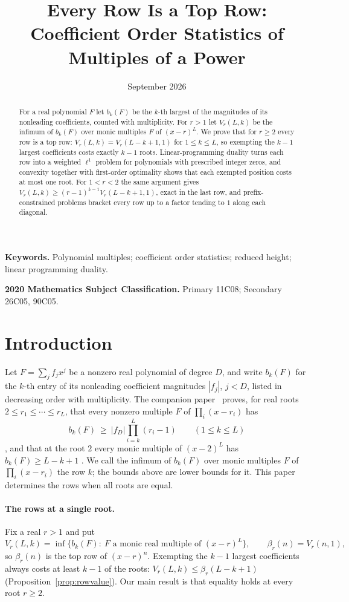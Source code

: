 \documentclass[11pt]{article}
\title{Every Row Is a Top Row: Coefficient Order Statistics of Multiples of a Power}
\author{\shortstack{Bangyen Pham\\
\small Independent Researcher\\
\small\href{mailto:bangyenp@gmail.com}{\texttt{bangyenp@gmail.com}}\\
\small\href{https://orcid.org/0009-0006-9928-2088}{ORCID: 0009-0006-9928-2088}}}
\date{September 2026}
\begin{document}
\maketitle

\begin{abstract}
For a real polynomial $F$ let $b_k(F)$ be the $k$-th largest of the
magnitudes of its nonleading coefficients, counted with multiplicity.
For $r>1$ let $V_r(L,k)$ be the infimum of $b_k(F)$ over monic multiples
$F$ of $(x-r)^L$.  We prove that for $r\ge2$ every row is a top row:
$V_r(L,k)=V_r(L-k+1,1)$ for $1\le k\le L$, so exempting the $k-1$ largest
coefficients costs exactly $k-1$ roots.  Linear-programming duality turns
each row into a weighted $\ell^1$ problem for polynomials with prescribed
integer zeros, and convexity together with first-order optimality shows
that each exempted position costs at most one root.  For $1<r<2$ the same
argument gives $V_r(L,k)\ge(r-1)^{k-1}V_r(L-k+1,1)$, exact in the last row,
and prefix-constrained problems bracket every row up to a factor tending
to $1$ along each diagonal.
\end{abstract}

\noindent\textbf{Keywords.} Polynomial multiples; coefficient order
statistics; reduced height; linear programming duality.

\noindent\textbf{2020 Mathematics Subject Classification.} Primary 11C08; Secondary 26C05, 90C05.

\section{Introduction}\label{sec:intro}

Let $F=\sum_jf_jx^j$ be a nonzero real polynomial of degree $D$, and write
$b_k(F)$ for the $k$-th entry of its nonleading coefficient magnitudes
$|f_j|$, $j<D$, listed in decreasing order with multiplicity.  The companion
paper~\cite{coefficient-mass} proves, for real
roots $2\le r_1\le\cdots\le r_L$, that every nonzero multiple $F$ of
$\prod_i(x-r_i)$ has
\[
  b_k(F)\ \ge\ |f_D|\prod_{i=k}^L(r_i-1)\qquad(1\le k\le L)
\]
\cite[Theorem~3.2]{coefficient-mass}, and that at the root $2$ every monic
multiple of $(x-2)^L$ has $b_k(F)\ge L-k+1$
\cite[Theorem~5.9]{coefficient-mass}.  We call the infimum of
$b_k(F)$ over monic multiples $F$ of $\prod_i(x-r_i)$ the row $k$; the bounds
above are lower bounds for it.  This paper determines the rows when all
roots are equal.

\paragraph{The rows at a single root.}
Fix a real $r>1$ and put
\[
  V_r(L,k)=\inf\{b_k(F):\ F\text{ a monic real multiple of }(x-r)^L\},
  \qquad \beta_r(n)=V_r(n,1),
\]
so $\beta_r(n)$ is the top row of $(x-r)^n$.  Exempting the $k-1$ largest
coefficients always costs at least $k-1$ of the roots:
$V_r(L,k)\le\beta_r(L-k+1)$ (Proposition~\ref{prop:rowvalue}).  Our main result is that equality holds
at every root $r\ge2$.
\end{document}
